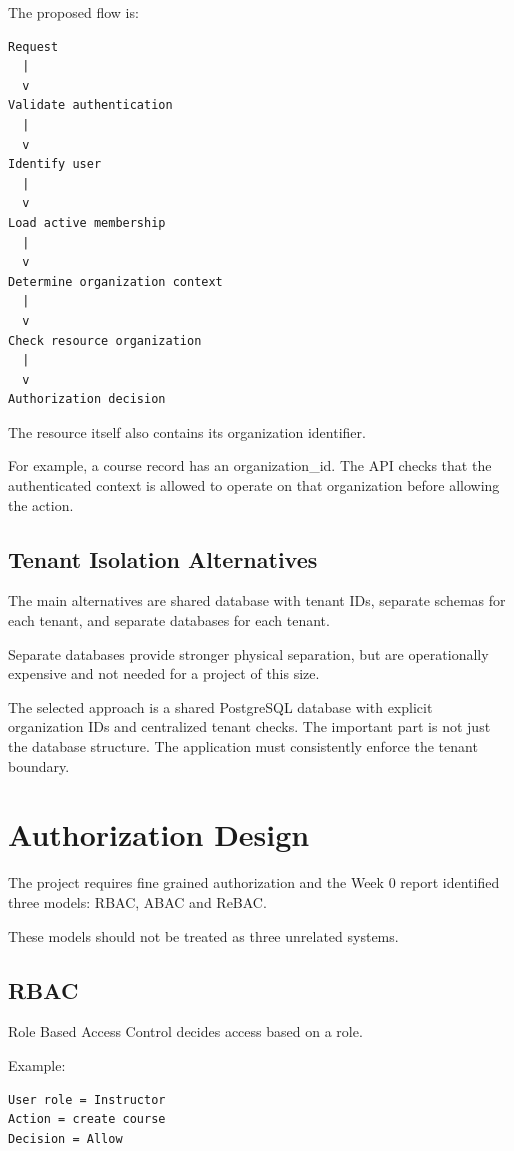 \documentclass[11pt,a4paper]{article}
\begin{document}
The proposed flow is:

\begin{verbatim}
Request
  |
  v
Validate authentication
  |
  v
Identify user
  |
  v
Load active membership
  |
  v
Determine organization context
  |
  v
Check resource organization
  |
  v
Authorization decision
\end{verbatim}

The resource itself also contains its organization identifier.

For example, a course record has an organization_id. The API checks that the authenticated context is allowed to operate on that organization before allowing the action.

\subsection{Tenant Isolation Alternatives}

The main alternatives are shared database with tenant IDs, separate schemas for each tenant, and separate databases for each tenant.

Separate databases provide stronger physical separation, but are operationally expensive and not needed for a project of this size.

The selected approach is a shared PostgreSQL database with explicit organization IDs and centralized tenant checks. The important part is not just the database structure. The application must consistently enforce the tenant boundary.

\section{Authorization Design}

The project requires fine grained authorization and the Week 0 report identified three models: RBAC, ABAC and ReBAC.

These models should not be treated as three unrelated systems.

\subsection{RBAC}

Role Based Access Control decides access based on a role.

Example:

\begin{verbatim}
User role = Instructor
Action = create course
Decision = Allow
\end{verbatim}
\end{document}
